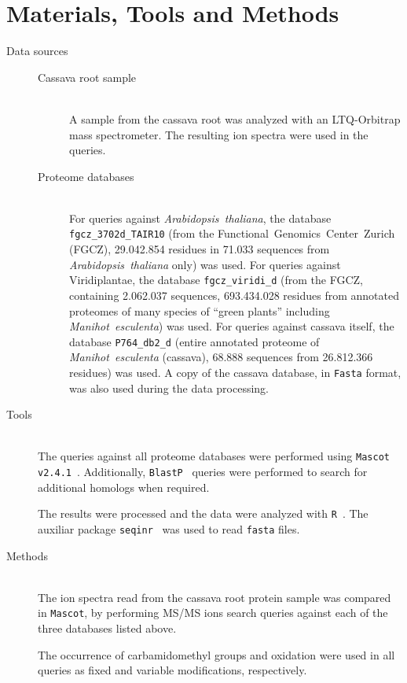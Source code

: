 \documentclass[oneside, a4paper, final]{memoir} %
\begin{document}
\section{Materials, Tools and Methods}
\begin{description}
	\item[Data sources]\hfill
		\begin{description}
			\item[Cassava root sample]\hfill\\
				A sample from the cassava root was analyzed with an LTQ-Orbitrap mass spectrometer. The resulting ion spectra were used in the queries.
			\item[Proteome databases]\hfill\\
				For queries against \emph{Arabidopsis~thaliana}, the database \texttt{fgcz\_3702d\_TAIR10}\cite{arabidopsisdb} 
				(from the Functional~Genomics~Center~Zurich (FGCZ), 29.042.854 residues in 71.033 sequences from \emph{Arabidopsis~thaliana} only) was used.
				For queries against Viridiplantae, the database \texttt{fgcz\_viridi\_d}
				(from the FGCZ, containing 2.062.037 sequences, 693.434.028 residues from annotated proteomes
				of many species of ``green plants'' \textendash including \emph{Manihot~esculenta}\textendash) was used.
				For queries against cassava itself, the database	\texttt{P764\_db2\_d} \cite{cassavadb} (entire
				annotated proteome of \emph{Manihot~esculenta} (cassava), 68.888 sequences from 26.812.366 residues) was used.
				A copy of the cassava database, in \texttt{Fasta} format, was also used during the data processing.
		\end{description}
	\item[Tools]\hfill\\
		The queries against all proteome databases were performed using \texttt{Mascot v2.4.1}~\cite{mascot}.
		Additionally, \texttt{BlastP}~\cite{gappedblast, blastp} queries were performed to search for additional homologs when required.

		The results were processed and the data were analyzed with \texttt{R}~\cite{R}. The auxiliar package \texttt{seqinr}~\cite{seqinr} was used to read \texttt{fasta} f{}iles.
	\item[Methods]\hfill\\
		The ion spectra read from the cassava root protein sample was compared in \texttt{Mascot}, by performing MS/MS ions search queries against each of the three databases listed above.

		The occurrence of carbamidomethyl groups and oxidation were used in all queries as f{}ixed and variable modif{}ications, respectively.


\end{description}
\end{document}
